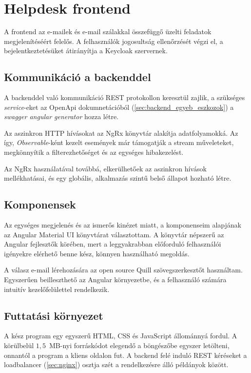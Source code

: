 \section{Helpdesk frontend}
A frontend az e-mailek és e-mail szálakkal összefüggő üzelti feladatok megjelenítéséért felelős. A felhasználók jogosultság ellenőrzését végzi el, a bejelentkeztetésüket átirányítja a Keycloak szervernek. 


\subsection{Kommunikáció a backenddel}
A backenddel való kommunikáció REST protokollon keresztül zajlik, a szükséges \textit{service}-eket az OpenApi dokumnetációból (\ref{sec:backend_egyeb_eszkozok}) a \textit{swagger angular generator} hozza létre.

Az aszinkron HTTP hívásokat az NgRx könyvtár alakítja adatfolyamokká. 
Az így, \textit{Observable}-ként kezelt események már támogatják a stream műveleteket, megkönnyítik a filterezhetőséget és az egységes hibakezelést. 

Az NgRx használatával továbbá, elkerülhetőek az aszinkron hívások mellékhatásai, és egy globális, alkalmazás szintű belső állapot hozható létre.

\subsection{Komponensek}
Az egységes megjelenés és az ismerős kinézet miatt, a komponenseim alapjának az Angular Material UI könyvtárat választottam. A könyvtár	népszerű az Angular fejlesztők körében, mert a leggyakrabban előforduló felhasználói igényekre elérhető benne kész, könnyen használható megoldás.

A válasz e-mail lérehozására az open source Quill szövegszerkesztőt használtam.
Egyszerűen beilleszthető az Angular környezetbe, és a felhasználó számára intuitív kezelőfelülettel rendelkezik.


\subsection{Futtatási környezet}
A kész program egy egyszerű HTML, CSS és JavaScript állománnyá fordul. A körülbelül $1,5$~MB-nyi forráskódot elegendő a böngészőbe egyszer letölteni, onnantól a program a kliens oldalon fut. A backend felé induló REST kéréseket a loadbalancer (\ref{sec:nginx}) osztja szét a rendelkezésre álló példányok között.




